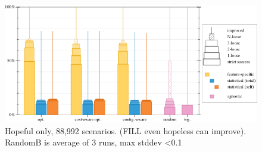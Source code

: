 \begin{figure}[t]
  \includegraphics[width=0.8\columnwidth]{data/strategy-overall-hope.pdf}
  \caption{Hopeful only, 88,992 scenarios. (FILL even hopeless can improve). RandomB is average of 3 runs, max stddev <0.1}
  \label{f:strategy-hope}
\end{figure}

\clearpage

